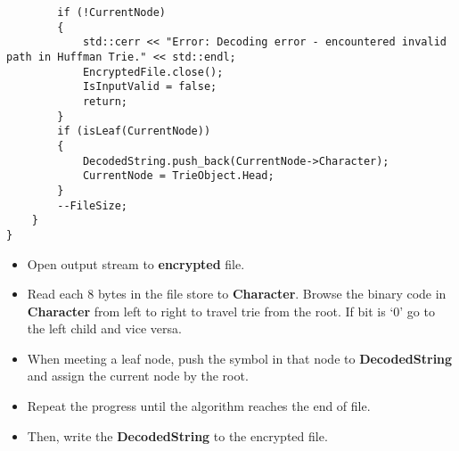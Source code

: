 \begin{enumerate}[label=\textbf{\Alph*.}]
\begin{itemize}
\begin{verbatim}
        if (!CurrentNode)
        {
            std::cerr << "Error: Decoding error - encountered invalid path in Huffman Trie." << std::endl;
            EncryptedFile.close();
            IsInputValid = false;
            return;            
        }
        if (isLeaf(CurrentNode))
        {
            DecodedString.push_back(CurrentNode->Character); 
            CurrentNode = TrieObject.Head; 
        }
        --FileSize;
    }
}
\end{verbatim}
        \begin{itemize}
            \item Open output stream to \textbf{encrypted} file.
            \item Read each 8 bytes in the file store to \textbf{Character}. Browse the binary code in \textbf{Character} from left to right to travel trie from the root. If bit is ‘0’ go to the left child and vice versa.
            \item When meeting a leaf node, push the symbol in that node to \textbf{DecodedString} and assign the current node by the root.
            \item Repeat the progress until the algorithm reaches the end of file.
            \item Then, write the \textbf{DecodedString} to the encrypted file.
        \end{itemize}
    \end{itemize}
\end{enumerate}
